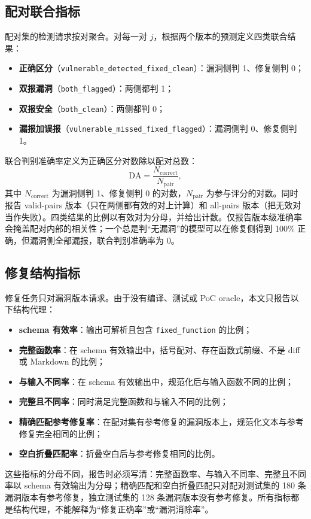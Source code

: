 \documentclass[conference]{IEEEtran}
\begin{document}
\subsection{配对联合指标}
配对集的检测请求按对聚合。对每一对 $j$，根据两个版本的预测定义四类联合结果：
\begin{itemize}
    \item \textbf{正确区分}（\texttt{vulnerable\_detected\_fixed\_clean}）：漏洞侧判 1、修复侧判 0；
    \item \textbf{双报漏洞}（\texttt{both\_flagged}）：两侧都判 1；
    \item \textbf{双报安全}（\texttt{both\_clean}）：两侧都判 0；
    \item \textbf{漏报加误报}（\texttt{vulnerable\_missed\_fixed\_flagged}）：漏洞侧判 0、修复侧判 1。
\end{itemize}
联合判别准确率定义为正确区分对数除以配对总数：
\begin{equation}
\mathrm{DA}=\frac{N_{\mathrm{correct}}}{N_{\mathrm{pair}}},
\end{equation}
其中 $N_{\mathrm{correct}}$ 为漏洞侧判 1、修复侧判 0 的对数，$N_{\mathrm{pair}}$ 为参与评分的对数。同时报告 valid-pairs 版本（只在两侧都有效的对上计算）和 all-pairs 版本（把无效对当作失败）。四类结果的比例以有效对为分母，并给出计数。仅报告版本级准确率会掩盖配对内部的相关性；一个总是判“无漏洞”的模型可以在修复侧得到 100\% 正确，但漏洞侧全部漏报，联合判别准确率为 0。

\subsection{修复结构指标}
修复任务只对漏洞版本请求。由于没有编译、测试或 PoC oracle，本文只报告以下结构代理：
\begin{itemize}
    \item \textbf{schema 有效率}：输出可解析且包含 \texttt{fixed\_function} 的比例；
    \item \textbf{完整函数率}：在 schema 有效输出中，括号配对、存在函数式前缀、不是 diff 或 Markdown 的比例；
    \item \textbf{与输入不同率}：在 schema 有效输出中，规范化后与输入函数不同的比例；
    \item \textbf{完整且不同率}：同时满足完整函数和与输入不同的比例；
    \item \textbf{精确匹配参考修复率}：在配对集有参考修复的漏洞版本上，规范化文本与参考修复完全相同的比例；
    \item \textbf{空白折叠匹配率}：折叠空白后与参考修复相同的比例。
\end{itemize}
这些指标的分母不同，报告时必须写清：完整函数率、与输入不同率、完整且不同率以 schema 有效输出为分母；精确匹配和空白折叠匹配只对配对测试集的 180 条漏洞版本有参考修复，独立测试集的 128 条漏洞版本没有参考修复。所有指标都是结构代理，不能解释为“修复正确率”或“漏洞消除率”。
\end{document}
